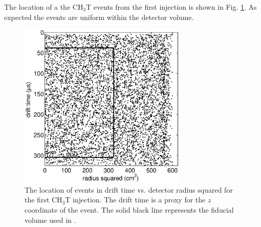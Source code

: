 The location of a the CH$_3$T events from the first injection is shown in Fig. \ref{fig:event_location}. As expected the events are uniform within the detector volume.
 
\begin{figure}[h!]\centering
\includegraphics[width=80mm]{CH3T_RZ_scatter_lux10_20130812T1546.eps}
\caption{The location of events in drift time vs. detector radius squared for the first CH$_3$T injection. The drift time is a proxy for the $z$ coordinate of the event. The solid black line represents the fiducial volume used in \cite{luxresults}.}
\label{fig:event_location}
\end{figure}





